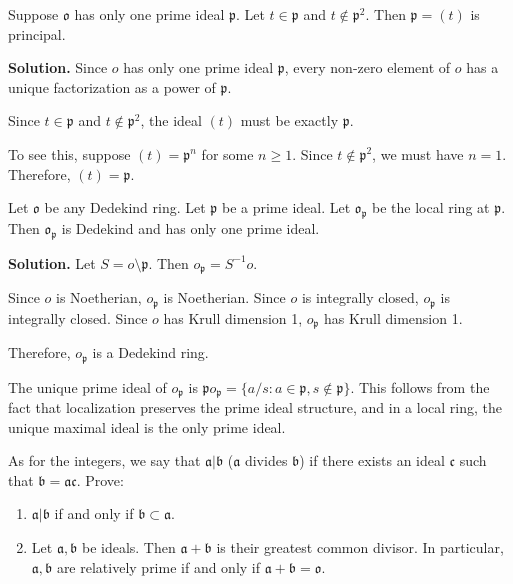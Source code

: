 \begin{problembox}
Suppose $\mathfrak{o}$ has only one prime ideal $\mathfrak{p}$. Let $t \in \mathfrak{p}$ and $t \notin \mathfrak{p}^2$. Then $\mathfrak{p} = (t)$ is principal.
\end{problembox}

\noindent\textbf{Solution.}
Since $o$ has only one prime ideal $\mathfrak{p}$, every non-zero element of $o$ has a unique factorization as a power of $\mathfrak{p}$.

Since $t \in \mathfrak{p}$ and $t \notin \mathfrak{p}^2$, the ideal $(t)$ must be exactly $\mathfrak{p}$.

To see this, suppose $(t) = \mathfrak{p}^n$ for some $n \geq 1$. Since $t \notin \mathfrak{p}^2$, we must have $n = 1$. Therefore, $(t) = \mathfrak{p}$.

\begin{problembox}
Let $\mathfrak{o}$ be any Dedekind ring. Let $\mathfrak{p}$ be a prime ideal. Let $\mathfrak{o}_{\mathfrak{p}}$ be the local ring at $\mathfrak{p}$. Then $\mathfrak{o}_{\mathfrak{p}}$ is Dedekind and has only one prime ideal.
\end{problembox}

\noindent\textbf{Solution.}
Let $S = o \setminus \mathfrak{p}$. Then $o_{\mathfrak{p}} = S^{-1}o$.

Since $o$ is Noetherian, $o_{\mathfrak{p}}$ is Noetherian. Since $o$ is integrally closed, $o_{\mathfrak{p}}$ is integrally closed. Since $o$ has Krull dimension 1, $o_{\mathfrak{p}}$ has Krull dimension 1.

Therefore, $o_{\mathfrak{p}}$ is a Dedekind ring.

The unique prime ideal of $o_{\mathfrak{p}}$ is $\mathfrak{p} o_{\mathfrak{p}} = \{a/s : a \in \mathfrak{p}, s \notin \mathfrak{p}\}$. This follows from the fact that localization preserves the prime ideal structure, and in a local ring, the unique maximal ideal is the only prime ideal.

\begin{problembox}
As for the integers, we say that $\mathfrak{a} | \mathfrak{b}$ ($\mathfrak{a}$ divides $\mathfrak{b}$) if there exists an ideal $\mathfrak{c}$ such that $\mathfrak{b} = \mathfrak{a}\mathfrak{c}$. Prove:
\begin{enumerate}[label=(\alph*)]
    \item $\mathfrak{a} | \mathfrak{b}$ if and only if $\mathfrak{b} \subset \mathfrak{a}$.
    \item Let $\mathfrak{a}, \mathfrak{b}$ be ideals. Then $\mathfrak{a} + \mathfrak{b}$ is their greatest common divisor. In particular, $\mathfrak{a}, \mathfrak{b}$ are relatively prime if and only if $\mathfrak{a} + \mathfrak{b} = \mathfrak{o}$.
\end{enumerate}
\end{problembox}

